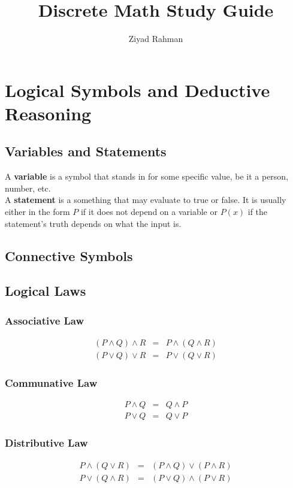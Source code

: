 \documentclass{article}
\title{Discrete Math Study Guide}
\author{Ziyad Rahman}
\date{}
\begin{document}
\maketitle

\tableofcontents
\newpage

\section{Logical Symbols and Deductive Reasoning}
\subsection{Variables and Statements}
A \textbf{variable} is a symbol that stands in for some specific value, be it a
person, number, etc. \\

\noindent A \textbf{statement} is a something that may evaluate to true or false.
It is usually either in the form $P$ if it does not depend on a variable
or $P(x)$ if the statement's truth depends on what the input is.

\subsection{Connective Symbols}
\subsection{Logical Laws}
\subsubsection{Associative Law}
\begin{eqnarray}
    (P \land Q) \land R &=& P \land (Q \land R) \\
    (P \lor Q) \lor R &=& P \lor (Q \lor R)
\end{eqnarray}

\subsubsection{Communative Law}
\begin{eqnarray}
    P \land Q &=& Q \land P \\
    P \lor Q &=& Q \lor P
\end{eqnarray}
\subsubsection{Distributive Law}
\begin{eqnarray}
    P \land (Q \lor R) &=& (P \land Q) \lor (P \land R) \\
    P \lor (Q \land R) &=& (P \lor Q) \land (P \lor R)
\end{eqnarray}
\end{document}
